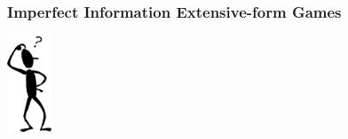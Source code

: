 \begin{frame}
    \frametitle{Imperfect Information Extensive-form Games}

    \centering
    \includegraphics[width=0.1\textwidth]{Bin/thinking.png}
\end{frame}
